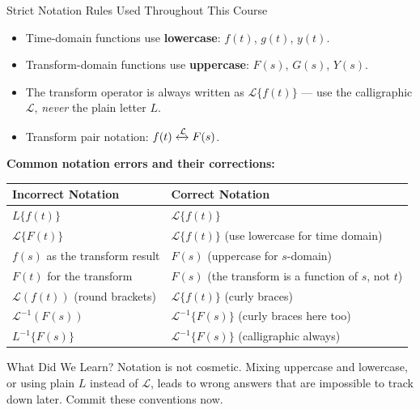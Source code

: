 \documentclass[12pt,a4paper]{article}
\begin{document}
\begin{infobox}{Strict Notation Rules Used Throughout This Course}
\begin{itemize}[leftmargin=1.5cm]
  \item Time-domain functions use \textbf{lowercase}: $f(t)$, $g(t)$, $y(t)$.
  \item Transform-domain functions use \textbf{uppercase}: $F(s)$, $G(s)$,
        $Y(s)$.
  \item The transform operator is always written as $\mathcal{L}\{f(t)\}$ ---
        use the calligraphic $\mathcal{L}$, \emph{never} the plain letter $L$.
  \item Transform pair notation:
        $f(t) \xleftrightarrow{\mathcal{L}} F(s)$.
\end{itemize}

\medskip
\noindent\textbf{Common notation errors and their corrections:}

\medskip
\begin{center}
\begin{tabular}{@{}ll@{}}
\toprule
\textbf{Incorrect Notation} & \textbf{Correct Notation} \\
\midrule
$L\{f(t)\}$ & $\mathcal{L}\{f(t)\}$ \\[3pt]
$\mathcal{L}\{F(t)\}$ & $\mathcal{L}\{f(t)\}$ (use lowercase for time domain) \\[3pt]
$f(s)$ as the transform result & $F(s)$ (uppercase for $s$-domain) \\[3pt]
$F(t)$ for the transform & $F(s)$ (the transform is a function of $s$, not $t$) \\[3pt]
$\mathcal{L}(f(t))$ (round brackets) & $\mathcal{L}\{f(t)\}$ (curly braces) \\[3pt]
$\mathcal{L}^{-1}(F(s))$ & $\mathcal{L}^{-1}\{F(s)\}$ (curly braces here too) \\[3pt]
$L^{-1}\{F(s)\}$ & $\mathcal{L}^{-1}\{F(s)\}$ (calligraphic always) \\
\bottomrule
\end{tabular}
\end{center}
\end{infobox}

\begin{learnbox}{What Did We Learn?}
Notation is not cosmetic. Mixing uppercase and lowercase, or using plain $L$
instead of $\mathcal{L}$, leads to wrong answers that are impossible to track
down later. Commit these conventions now.
\end{learnbox}
\end{document}
